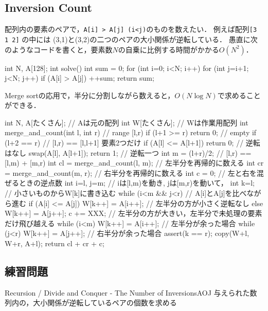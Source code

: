 \subsection{Inversion Count}

配列内の要素のペアで，\texttt{A[i] > A[j] (i<j)}のものを数えたい．
例えば配列\texttt{[3 1 2]} の中には (3,1)と(3,2)の二つのペアの大小関係が逆転している．
愚直に次のようなコードを書くと，要素数$N$の自乗に比例する時間がかかる$O(N^2)$．

\begin{cbox}
int N, A[128];
int solve() {
    int sum = 0;
    for (int i=0; i<N; i++)
        for (int j=i+1; j<N; j++)
            if (A[i] > A[j]) ++sum;
    return sum;
}
\end{cbox}

Merge sortの応用で，半分に分割しながら数えると，$O(N\log N)$で求めることができる．

\begin{cbox}[emph={merge_and_count}]
int N, A[たくさん]; // Aは元の配列
int W[たくさん]; // Wは作業用配列
int merge_and_count(int l, int r) { // range [l,r)
    if (l+1 >= r) return 0; // empty
    if (l+2 == r) { // [l,r) == [l,l+1] 要素2つだけ
        if (A[l] <= A[l+1]) return 0;  // 逆転はなし
        swap(A[l], A[l+1]);
        return 1; // 逆転一つ
    }
    int m = (l+r)/2; // [l,r) == [l,m) + [m,r)
    int cl = merge_and_count(l, m); // 左半分を再帰的に数える
    int cr = merge_and_count(m, r); // 右半分を再帰的に数える
    int c = 0; // 左と右を混ぜるときの逆点数
    int i=l, j=m; // iは[l,m)を動き, jは[m,r)を動いて，
    int k=l;      // 小さいものからW[k]に書き込む
    while (i<m && j<r) { // A[i]とA[j]を比べながら進む
        if (A[i] <= A[j]) W[k++] = A[i++]; // 左半分の方が小さく逆転なし
        else {
            W[k++] = A[j++];
            c += XXX; // 左半分の方が大きい，左半分で未処理の要素だけ飛び越える
        }
    }
    while (i<m) W[k++] = A[i++]; // 左半分が余った場合
    while (j<r) W[k++] = A[j++]; // 右半分が余った場合
    assert(k == r);
    copy(W+l, W+r, A+l);
    return cl + cr + c;
}
\end{cbox} 

\subsection{練習問題}


\begin{pbox}{Recursion / Divide and Conquer - The Number of Inversions}{AOJ}
与えられた数列内の，大小関係が逆転しているペアの個数を求める

\end{pbox}

